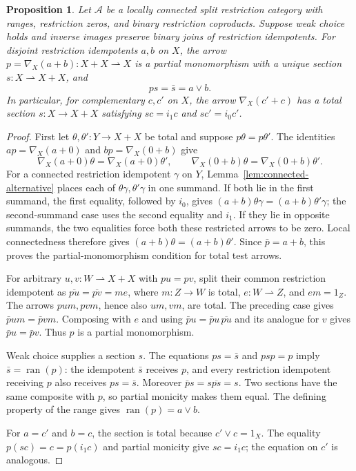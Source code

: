 \documentclass[11pt]{article}
\newtheorem{proposition}[theorem]{Proposition}
\newcommand{\ran}{\operatorname{ran}}
\begin{document}
\begin{proposition}\label{prop:local-switch}
Let $\mathcal A$ be a locally connected split restriction category with
ranges, restriction zeros, and binary restriction coproducts. Suppose
weak choice holds and inverse images preserve binary joins of
restriction idempotents.
For disjoint restriction idempotents $a,b$ on $X$, the arrow
$p=\nabla_X(a+b):X+X\rightharpoonup X$ is a partial monomorphism
with a unique section $s:X\rightharpoonup X+X$, and
\[
 ps=\bar s=a\vee b.
\]
In particular, for complementary $c,c'$ on $X$, the arrow
$\nabla_X(c'+c)$ has a total section $s:X\to X+X$ satisfying
$sc=i_1c$ and $sc'=i_0c'$.
\end{proposition}
\begin{proof}
First let $\theta,\theta':Y\to X+X$ be total and suppose
$p\theta=p\theta'$. The identities
$ap=\nabla_X(a+0)$ and $bp=\nabla_X(0+b)$ give
\[
 \nabla_X(a+0)\theta=\nabla_X(a+0)\theta',
 \qquad
 \nabla_X(0+b)\theta=\nabla_X(0+b)\theta'.
\]
For a connected restriction idempotent $\gamma$ on $Y$,
Lemma~\ref{lem:connected-alternative} places each of
$\theta\gamma,\theta'\gamma$ in one summand.
If both lie in the first summand, the first equality, followed by $i_0$,
gives $(a+b)\theta\gamma=(a+b)\theta'\gamma$; the second-summand
case uses the second equality and $i_1$.
If they lie in opposite summands, the two equalities force both these
restricted arrows to be zero. Local connectedness therefore gives
$(a+b)\theta=(a+b)\theta'$. Since $\bar p=a+b$, this proves the
partial-monomorphism condition for total test arrows.

For arbitrary $u,v:W\rightharpoonup X+X$ with $pu=pv$, split their
common restriction idempotent as
$\overline{pu}=\overline{pv}=me$, where $m:Z\to W$ is total,
$e:W\rightharpoonup Z$, and $em=1_Z$. The arrows $pum,pvm$, hence also $um,vm$, are total.
The preceding case gives $\bar p um=\bar p vm$. Composing with $e$
and using $\bar p u=\bar p u\,\overline{pu}$ and its analogue for $v$
gives $\bar p u=\bar p v$. Thus $p$ is a partial monomorphism.

Weak choice supplies a section $s$. The equations $ps=\bar s$ and
$psp=p$ imply $\bar s=\ran(p)$: the idempotent $\bar s$ receives $p$,
and every restriction idempotent receiving $p$ also receives
$ps=\bar s$. Moreover
$\bar p s=s\overline{ps}=s$. Two sections have the same composite
with $p$, so partial monicity makes them equal.
The defining property of the range gives $\ran(p)=a\vee b$.

For $a=c'$ and $b=c$, the section is total because $c'\vee c=1_X$.
The equality $p(sc)=c=p(i_1c)$ and partial monicity give $sc=i_1c$;
the equation on $c'$ is analogous.
\end{proof}
\end{document}
